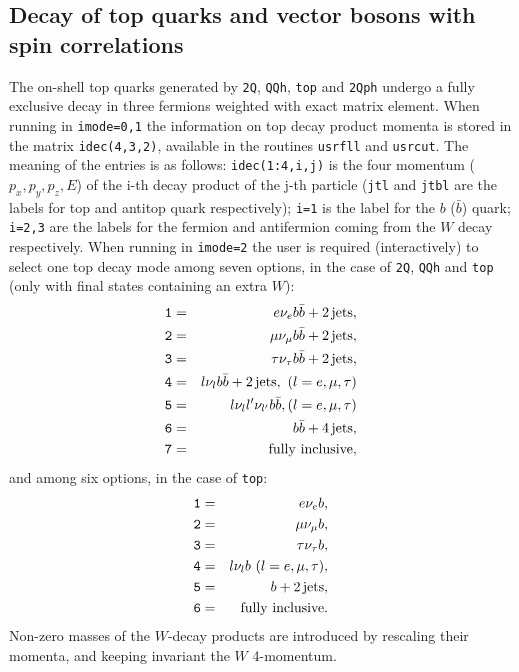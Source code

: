 \documentclass[paper]{JHEP3}
\begin{document}
\begin{appendix}
\subsection{Decay of top quarks and vector bosons with spin correlations}
\label{app:topdec}
The on-shell top quarks generated by {\tt 2Q}, {\tt QQh}, {\tt top}
and {\tt 2Qph} undergo 
a fully exclusive decay in three fermions weighted with exact matrix 
element.
When running in {\tt imode=0,1} the information on top decay product 
momenta is stored in the matrix {\tt idec(4,3,2)}, available in 
the routines {\tt usrfll} and {\tt usrcut}. The meaning of the entries 
is as follows: {\tt idec(1:4,i,j)} is the four momentum ($p_x, p_y,
p_z, E$) 
of the i-th decay product of the j-th particle ({\tt jtl} and {\tt jtbl} 
are the labels for top and antitop quark respectively); 
{\tt i=1} is the label for the $b$ ($\bar{b}$) quark; {\tt i=2,3} 
are the labels for the fermion and antifermion coming from the $W$ decay 
respectively. When running in {\tt imode=2} the user is required
(interactively) to 
select one top decay mode among seven options, in the case of {\tt 2Q}, {\tt QQh} and {\tt top} (only with final states containing an extra $W$): 
\begin{eqnarray}
{\tt 1} &=& e \nu_e b \bar b + 2\, {\rm jets},  \nonumber \\ 
{\tt 2} &=& \mu \nu_\mu b \bar b + 2\, {\rm jets}, \nonumber \\
{\tt 3} &=& \tau \nu_\tau b \bar b + 2\, {\rm jets},  \nonumber \\
{\tt 4} &=& l \nu_l b \bar b + 2\, {\rm jets},\, \, 
(l = e, \mu, \tau) \nonumber  \\
{\tt 5} &=& l \nu_l l' \nu_{l'} b \bar b, (l = e, \mu, \tau) \nonumber  \\
{\tt 6} &=& b \bar b + 4\,{\rm jets}, \nonumber \\
{\tt 7} &=& {\rm fully} \,\, {\rm inclusive}, \nonumber 
\end{eqnarray}
and among six options, in the case of {\tt top}: 
\begin{eqnarray}
{\tt 1} &=& e \nu_e b,  \nonumber \\ 
{\tt 2} &=& \mu \nu_\mu b, \nonumber \\
{\tt 3} &=& \tau \nu_\tau b,  \nonumber \\
{\tt 4} &=& l \nu_l b \, \, (l = e, \mu, \tau), \nonumber  \\
{\tt 5} &=& b + 2\,{\rm jets}, \nonumber \\
{\tt 6} &=& {\rm fully} \,\, {\rm inclusive}. \nonumber 
\end{eqnarray}
Non-zero  masses of the $W$-decay products are introduced by rescaling 
their momenta, and keeping invariant the $W$ 4-momentum.


\end{appendix}
\end{document}
